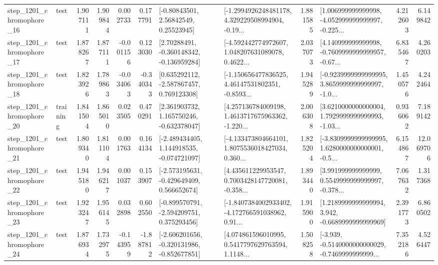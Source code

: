 \begin{tabular}{llrrrrllrlrr}
 step\_1201\_chromophore\_16 &      test &      1.907111 &    1.909844 &      0.002733 &  0.177791 &       [-0.80843501, 2.56842549, 0.25523945] &  [-1.2994926248481178, 4.329229508994904, -0.19... &       1.881585 &  [1.006999999999998, -4.052999999999997, -0.225... &            4.212603 &          6.149842 \\
 step\_1201\_chromophore\_17 &      test &      1.878267 &    1.877111 &     -0.001156 &  0.123030 &    [2.70288491, -0.360148342, -0.136959284] &  [-4.592442774972607, 1.048207631089078, 0.4622... &       2.037073 &  [4.140999999999998, -0.7609999999999957, -0.67... &            6.835467 &          4.260203 \\
 step\_1201\_chromophore\_18 &      test &      1.823926 &    1.789863 &     -0.034063 & -0.340343 &    [0.635292112, -2.587867457, 0.769123308] &  [-1.150656477836525, 4.46147531802351, -0.8593... &       1.945289 &  [-0.9239999999999995, 3.8659999999999997, -1.0... &            1.450576 &          4.242464 \\
 step\_1201\_chromophore\_20 &  training &      1.841504 &    1.865010 &      0.023505 &  0.470291 &    [2.361903732, 1.165750246, -0.632378047] &  [4.257136784009198, 1.4613717675963362, -1.220... &       2.006308 &  [3.6210000000000004, 1.7929999999999993, -1.03... &            0.936062 &          7.189142 \\
 step\_1201\_chromophore\_21 &      test &      1.809340 &    1.811104 &      0.001763 &  0.164134 &   [-2.489434405, 1.144918535, -0.074721097] &  [-4.133473804664101, 1.8075536018427034, 0.360... &       1.825204 &  [-3.8309999999999995, 1.6280000000000001, -0.5... &            6.154867 &         12.069706 \\
 step\_1201\_chromophore\_22 &      test &      1.945180 &    1.946217 &      0.001037 &  0.153907 &   [-2.573195631, -0.429649409, 0.566652674] &  [4.435611229953547, 0.7003428147720081, -0.358... &       1.893440 &  [3.991999999999999, 0.5549999999999997, -0.378... &            7.067632 &          1.317368 \\
 step\_1201\_chromophore\_23 &      test &      1.923247 &    1.956145 &      0.032898 &  0.602550 &   [-0.899570791, -2.594209751, 0.375293456] &  [-1.8407384002933402, -4.172766591038962, 0.91... &       1.915900 &   [1.2189999999999994, 3.942, -0.6689999999999969] &            2.391773 &          6.860502 \\
 step\_1201\_chromophore\_24 &      test &      1.876934 &    1.732975 &     -0.143959 & -1.887812 &  [-2.606201656, -0.320131986, -0.852677851] &  [4.074861596010995, 0.5417797629763594, 1.1148... &       1.508258 &  [-3.939, -0.5140000000000029, -0.7469999999999... &            7.352186 &          4.526447 \\

\end{tabular}
